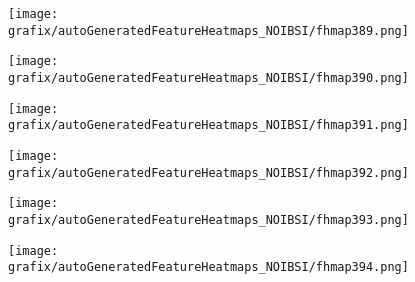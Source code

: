 \hspace{\hsp} 
\begin{subfigure}{\wid\textwidth} 
    \centering 
    \caption{\tiny \sffamily {}} 
    \vspace{\vsp} 
    \texttt{[image: grafix/autoGeneratedFeatureHeatmaps\_NOIBSI/fhmap389.png]} 
\end{subfigure} 
\hspace{\hsp} 
\begin{subfigure}{\wid\textwidth} 
    \centering 
    \caption{\tiny \sffamily {}} 
    \vspace{\vsp} 
    \texttt{[image: grafix/autoGeneratedFeatureHeatmaps\_NOIBSI/fhmap390.png]} 
\end{subfigure} 
\hspace{\hsp} 
\begin{subfigure}{\wid\textwidth} 
    \centering 
    \caption{\tiny \sffamily {}} 
    \vspace{\vsp} 
    \texttt{[image: grafix/autoGeneratedFeatureHeatmaps\_NOIBSI/fhmap391.png]} 
\end{subfigure} 
\hspace{\hsp} 
\begin{subfigure}{\wid\textwidth} 
    \centering 
    \caption{\tiny \sffamily {}} 
    \vspace{\vsp} 
    \texttt{[image: grafix/autoGeneratedFeatureHeatmaps\_NOIBSI/fhmap392.png]} 
\end{subfigure} 
\hspace{\hsp} 
\begin{subfigure}{\wid\textwidth} 
    \centering 
    \caption{\tiny \sffamily {}} 
    \vspace{\vsp} 
    \texttt{[image: grafix/autoGeneratedFeatureHeatmaps\_NOIBSI/fhmap393.png]} 
\end{subfigure} 
\hspace{\hsp} 
\begin{subfigure}{\wid\textwidth} 
    \centering 
    \caption{\tiny \sffamily {}} 
    \vspace{\vsp} 
    \texttt{[image: grafix/autoGeneratedFeatureHeatmaps\_NOIBSI/fhmap394.png]} 
\end{subfigure} 
\hspace{\hsp} 
